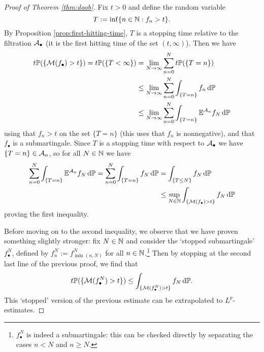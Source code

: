 \begin{proof}[Proof of Theorem \ref{thm:doob}]
  Fix $t > 0$ and define the random variable
  \begin{equation*}
    T :=  \inf\{n \in \mathbb{N} : f_n > t\}.
  \end{equation*}
  By Proposition \ref{prop:first-hitting-time}, $T$ is a stopping time relative to the filtration $\mathcal{A}_{\bullet}$ (it is the first hitting time of the set $(t,\infty)$).
  Then we have
  \begin{equation*} 
    \begin{aligned}
      t\mathbb{P}(\{\mathcal{M}(f_{\bullet}) > t\})
      = t\mathbb{P}(\{T < \infty\})
      &= \lim_{N \to \infty} \sum_{n = 0}^{N} t\mathbb{P}(\{T = n\}) \\
      &\leq \lim_{N \to \infty} \sum_{n = 0}^{N} \int_{\{T = n\}} f_n \, \mathrm{d}\mathbb{P}  \\ 
      &\leq \lim_{N \to \infty} \sum_{n = 0}^{N} \int_{\{T = n\}} \mathbb{E}^{\mathcal{A}_{n}} f_N \, \mathrm{d}\mathbb{P} 
    \end{aligned}
  \end{equation*}
  using that $f_n > t$ on the set $\{T = n\}$ (this uses that $f_{n}$ is nonnegative), and that $f_{\bullet}$ is a submartingale.
  Since $T$ is a stopping time with respect to $\mathcal{A}_{\bullet}$ we have $\{T = n\} \in \mathcal{A}_{n}$, so for all $N \in \mathbb{N}$ we have
  \begin{equation*}
    \begin{aligned}
     \sum_{n = 0}^{N} \int_{\{T = n\}} \mathbb{E}^{\mathcal{A}_{n}} f_N \, \mathrm{d}\mathbb{P} 
    =  \sum_{n = 0}^{N} \int_{\{T = n\}} f_{N} \, \mathrm{d}\mathbb{P} 
    &=  \int_{\{T \leq N\}} f_{N} \, \mathrm{d}\mathbb{P} \\
    &\leq \sup_{N \in \mathbb{N}} \int_{\{\mathcal{M}(f_{\bullet}) > t\}} f_{N} \, \mathrm{d}\mathbb{P}
  \end{aligned}
  \end{equation*}
  proving the first inequality.

  Before moving on to the second inequality, we observe that we have proven something slightly stronger: fix $N \in \mathbb{N}$ and consider the `stopped submartingale' $f_{\bullet}^{N}$, defined by $f_{n}^{N} := f_{\min(n,N)}^{N}$ for all $n \in \mathbb{N}$.\footnote{$f_{\bullet}^{N}$ is indeed a submartingale: this can be checked directly by separating the cases $n < N$ and $n \geq N$.}
  Then by stopping at the second last line of the previous proof, we find that
  \begin{equation}\label{eq:doob-stopped}
    t\mathbb{P}(\{\mathcal{M}(f_{\bullet}^{N}) > t\}) \leq \int_{\{\mathcal{M}(f_{\bullet}^{N}) > t\}} f_{N} \, \mathrm{d} \mathbb{P}.
  \end{equation}
  This `stopped' version of the previous estimate can be extrapolated to $L^p$-estimates.


\end{proof}
